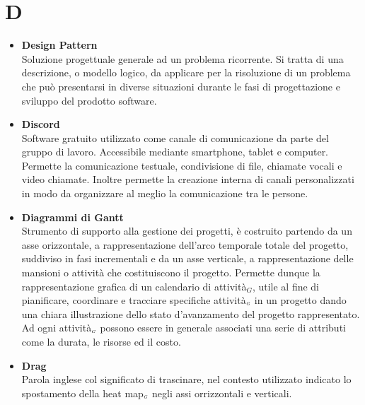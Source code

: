 \chapter{D} \label{D}
	\begin{itemize}		
		\item \textbf{Design Pattern}\\
		Soluzione progettuale generale ad un problema ricorrente. Si tratta di una descrizione, o modello logico, da applicare per la risoluzione di un problema che può presentarsi in diverse situazioni durante le fasi di progettazione e sviluppo del prodotto software.
		
		\item \textbf{Discord}\\
		Software gratuito utilizzato come canale di comunicazione da parte del gruppo di lavoro.
		Accessibile mediante smartphone, tablet e computer.
		Permette la comunicazione testuale, condivisione di file, chiamate vocali e video chiamate.
		Inoltre permette la creazione interna di canali personalizzati in modo da organizzare al meglio la comunicazione tra le persone.
		
		\item \textbf{Diagrammi di Gantt}\\
		Strumento di supporto alla gestione dei progetti, è costruito partendo da un asse orizzontale, a rappresentazione dell'arco temporale totale del progetto, suddiviso in fasi incrementali  e da un asse verticale, a rappresentazione delle mansioni o attività che costituiscono il progetto. Permette dunque la rappresentazione grafica di un calendario di attività$_G$, utile al fine di pianificare, coordinare e tracciare specifiche attività$_{\scaleto{G}{3pt}}$ in un progetto dando una chiara illustrazione dello stato d'avanzamento del progetto rappresentato.  Ad ogni attività$_{\scaleto{G}{3pt}}$ possono essere in generale associati una serie di attributi come la durata, le risorse ed il costo.
		
		\item \textbf{Drag}\\
		Parola inglese col significato di trascinare, nel contesto utilizzato indicato lo spostamento della heat map$_{\scaleto{G}{3pt}}$ negli assi orrizzontali e verticali.
	\end{itemize}
